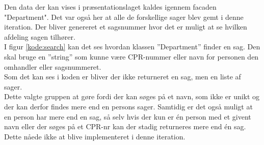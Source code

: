 Den data der kan vises i præsentationslaget kaldes igennem facaden "Department". Det var også her at alle de forskellige sager blev gemt i denne iteration. Der bliver genereret et sagsnummer hvor det er muligt at se hvilken afdeling sagen tilhører. \\ 
I figur \ref{kode:search} kan det ses hvordan klassen ”Department” finder en sag. Den skal bruge en ”string” som kunne være CPR-nummer eller navn for personen den omhandler eller  sagsnummeret. \\
Som det kan ses i koden er bliver der ikke returneret en sag, men en liste af sager.\\
Dette valgte gruppen at gøre fordi der kan søges på et navn, som ikke er unikt og der kan derfor findes mere end en persons sager. Samtidig er det også muligt at en person har mere end en sag, så selv hvis der kun er én person med et givent navn eller der søges på et CPR-nr kan der stadig returneres mere end én sag. Dette nåede ikke at blive implementeret i denne iteration. 

